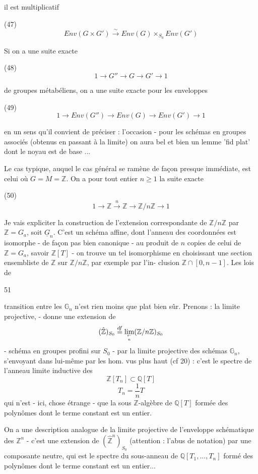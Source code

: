 il est multiplicatif

(47) $$Env(G \times G') \xrightarrow{\sim} Env(G) \times_{S_0} Env(G')$$

Si on a une suite exacte

(48) $$1 \to G'' \to G \to G' \to 1$$

de groupes métabéliens, on a une suite
exacte pour les enveloppes

(49) $$1 \to Env(G'') \to Env(G) \to Env(G') \to 1$$

\newpage


en un sens qu'il convient de préciser :
l'occasion - pour les schémas en groupes
associés (obtenus en passant à la limite) on
aura bel et bien un lemme 'fid plat' dont
le noyau est de base ...

Le cas typique, auquel le cas général
se ramène de façon presque immédiate, est
celui où $G = M = \mathbb{Z}$. On a pour
tout entier $n \ge 1$ la suite exacte

(50) $$1 \to \mathbb{Z} \xrightarrow{n} \mathbb{Z} \to \mathbb{Z}/n\mathbb{Z} \to 1$$

Je vais expliciter la construction
de l'extension correspondante de
$\mathbb{Z}/n\mathbb{Z}$ par $\mathbb{Z} = G_a$, soit $\underline{G}_n$.
C'est un schéma affine, dont l'anneau
des coordonnées est isomorphe - de façon pas
bien canonique - au produit de
$n$ copies de celui de $\mathbb{Z} = G_a$, savoir
$\mathbb{Z}[T]$ - on trouve un tel isomorphisme
en choisissant une section ensembliste de
$\mathbb{Z}$ sur $\mathbb{Z}/n\mathbb{Z}$, par exemple par l'in-
clusion $\mathbb{Z} \cap [0, n-1]$. Les lois de

\newpage


51

transition entre les $\mathbb{G}_n$ n'est rien moins que
plat bien sûr. Prenons : la limite projective,
- donne une extension de
$$(\hat{\mathbb{Z}})_{S_0} \stackrel{df}{=} \lim_{\leftarrow\atop n} (\mathbb{Z}/n\mathbb{Z})_{S_0}$$
- schéma en groupes profini sur $S_0$ -
par la limite projective des schémas
$\mathbb{G}_n$, s'envoyant dans lui-même par les hom.
vus plus haut (cf 20) : c'est le spectre
de l'anneau limite inductive des
$$\mathbb{Z}[T_n] \subset \mathbb{Q}[T]$$
$$T_n = \frac{1}{n} T$$
qui n'est - ici, chose étrange - que la sous $\mathbb{Z}$-algèbre
de $\mathbb{Q}[T]$ formée des polynômes
dont le terme constant est un entier.

On a une description analogue de
la limite projective de l'enveloppe
schématique des $\mathbb{Z}^n$ - c'est une
extension de $(\hat{\mathbb{Z}}^n)_{S_0}$ (attention : l'abus
de notation) par une composante neutre,
qui est le spectre du sous-anneau
de $\mathbb{Q}[T_1, ..., T_n]$ formé des polynômes dont
le terme constant est un entier...

